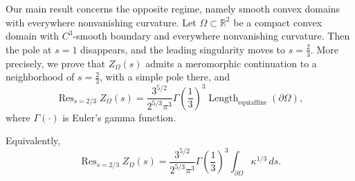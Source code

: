 \documentclass[a4paper,american,11pt]{amsart}
\theoremstyle{plain}
\theoremstyle{definition}
\newcommand{\R}{\mathbb R}
\DeclareMathOperator*{\Res}{Res}
\DeclareMathOperator{\Length}{Length}
\begin{document}
Our main result concerns the opposite regime, namely smooth convex domains
with everywhere nonvanishing curvature. Let \(\Omega\subset\R^2\) be a compact
convex domain with \(C^3\)-smooth boundary and everywhere nonvanishing
curvature. Then the pole at \(s=1\) disappears, and the leading singularity
moves to \(s=\tfrac23\). More precisely, we prove that \(Z_\Omega(s)\) admits
a meromorphic continuation to a neighborhood of \(s=\tfrac23\), with a simple
pole there, and
\[
\Res_{s=2/3} Z_\Omega(s)
=
\frac{3^{5/2}}{2^{5/3}\pi^3}\Gamma\!\left(\frac13\right)^3
\Length_{\mathrm{equiaffine}}(\partial\Omega),
\]
where \(\Gamma(\cdot)\) is Euler's gamma function.

Equivalently,
\[
\Res_{s=2/3} Z_\Omega(s)
=
\frac{3^{5/2}}{2^{5/3}\pi^3}\Gamma\!\left(\frac13\right)^3
\int_{\partial\Omega}\kappa^{1/3}\,ds.
\]
\end{document}
